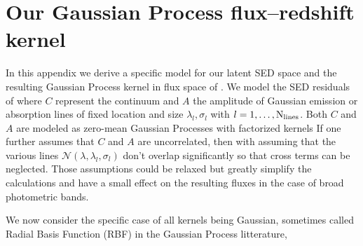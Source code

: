 \documentclass[aps,prd,showpacs,superscriptaddress,groupedaddress]{revtex4}  %
\begin{document}
\section{Our Gaussian Process flux--redshift kernel}\label{sec:rbfgp}

In this appendix we derive a specific model for our latent SED space and the resulting Gaussian Process kernel in flux space of .
We model the SED residuals of 
where $C$ represent the continuum and $A$ the amplitude of Gaussian emission or absorption lines of fixed location and size $ \lambda_l, \sigma_l$ with $l = 1, \ldots, {\rm N}_{\rm lines}$. 
Both $C$ and $A$ are modeled as zero-mean Gaussian Processes with factorized kernels
If one further assumes that $C$ and $A$ are uncorrelated, then 
with 
assuming that the various lines $\mathcal{N}(\lambda, \lambda_l, \sigma_l)$ don't overlap significantly so that cross terms can be neglected. 
Those assumptions could be relaxed but greatly simplify the calculations and have a small effect on the resulting fluxes in the case of broad photometric bands.

We now consider the specific case of all kernels being Gaussian, sometimes called Radial Basis Function (RBF) in the Gaussian Process litterature,
\end{document}
